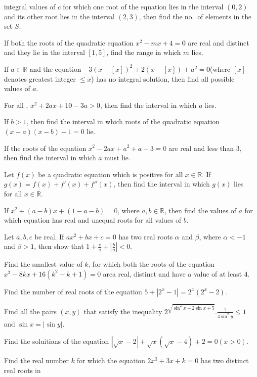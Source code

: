   integral values of $c$ for which one root of the equation lies in the interval $(0, 2)$ and its other root
  lies in the interval $(2, 3)$, then find the no.\ of elements in the set $S$.
\item If both the roots of the quadratic equation $x^2 - mx + 4 = 0$ are real and distinct and they lie in
  the interval $[1, 5]$, find the range in which $m$ lies.
\item If $a\in\mathbb{R}$ and the equation $-3(x - [x])^2 + 2(x - [x]) + a^2 = 0$(where $[x]$ denotes
  greatest integer $\leq x$) has no integral solution, then find all possible values of $a$.
\item For all , $x^2 + 2ax + 10 - 3a > 0$, then find the interval in which $a$ lies.
\item If $b > 1$, then find the interval in which roots of the quadratic equation $(x - a)(x - b) - 1 = 0$
  lie.
\item If the roots of the equation $x^2 - 2ax + a^2 + a - 3 = 0$ are real and less than $3$, then find the
  interval in which $a$ must lie.
\item Let $f(x)$ be a quadratic equation which is positive for all $x\in\mathbb{R}$. If $g(x) = f(x) + f'(x)
  + f''(x)$, then find the interval in which $g(x)$ lies for all $x\in\mathbb{R}$.
\item If $x^2 + (a - b)x + (1 - a - b) = 0$, where $a, b\in\mathbb{R}$, then find the values of $a$ for
  which equation has real and unequal roots for all values of $b$.
\item Let $a, b, c$ be real. If $ax^2 + bx + c = 0$ has two real roots $\alpha$ and $\beta$, where $\alpha <
  - 1$ and $\beta > 1$, then show that $1 + \frac{c}{a} + \left|\frac{b}{a}\right| < 0$.
\item Find the smallest value of $k$, for which both the roots of the equation $x^2 - 8kx + 16\left(k^2 - k
  + 1\right) = 0$ area real, distinct and have a value of at least $4$.
\item Find the number of real roots of the equation $5 + \left|2^x - 1\right| = 2^x(2^x - 2)$.
\item Find all the pairs $(x, y)$ that satisfy the inequality $2^{\sqrt{\sin^2x - 2\sin x +
    5}}.\frac{1}{4\sin^2y}\leq 1$ and $\sin x = \left|\sin y\right|$.
\item Find the soluitions of the equation $\left|\sqrt{x} - 2\right| + \sqrt{x}\left(\sqrt{x} - 4\right) +
  2 = 0(x > 0)$.
\item Find the real number $k$ for which the equation $2x^3 + 3x + k = 0$ has two distinct real roots in
